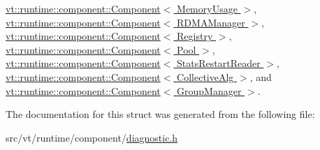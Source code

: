 \hyperlink{structvt_1_1runtime_1_1component_1_1_component_adaf8bd995d4c91702e2ff7806ad9e695}{vt\+::runtime\+::component\+::\+Component$<$ Memory\+Usage $>$}, \hyperlink{structvt_1_1runtime_1_1component_1_1_component_adaf8bd995d4c91702e2ff7806ad9e695}{vt\+::runtime\+::component\+::\+Component$<$ R\+D\+M\+A\+Manager $>$}, \hyperlink{structvt_1_1runtime_1_1component_1_1_component_adaf8bd995d4c91702e2ff7806ad9e695}{vt\+::runtime\+::component\+::\+Component$<$ Registry $>$}, \hyperlink{structvt_1_1runtime_1_1component_1_1_component_adaf8bd995d4c91702e2ff7806ad9e695}{vt\+::runtime\+::component\+::\+Component$<$ Pool $>$}, \hyperlink{structvt_1_1runtime_1_1component_1_1_component_adaf8bd995d4c91702e2ff7806ad9e695}{vt\+::runtime\+::component\+::\+Component$<$ Stats\+Restart\+Reader $>$}, \hyperlink{structvt_1_1runtime_1_1component_1_1_component_adaf8bd995d4c91702e2ff7806ad9e695}{vt\+::runtime\+::component\+::\+Component$<$ Collective\+Alg $>$}, and \hyperlink{structvt_1_1runtime_1_1component_1_1_component_adaf8bd995d4c91702e2ff7806ad9e695}{vt\+::runtime\+::component\+::\+Component$<$ Group\+Manager $>$}.



The documentation for this struct was generated from the following file\+:\begin{DoxyCompactItemize}
\item 
src/vt/runtime/component/\hyperlink{diagnostic_8h}{diagnostic.\+h}\end{DoxyCompactItemize}
